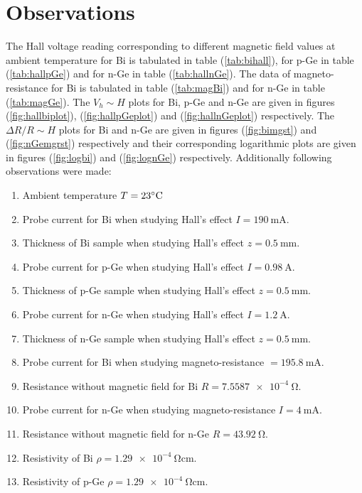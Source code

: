 \documentclass[%
 aip,
 amsmath,amssymb,
 reprint,%
]{revtex4-1}
\begin{document}
\section{Observations}
    The Hall voltage reading corresponding to different magnetic field values at ambient temperature for Bi is tabulated in table (\ref{tab:bihall}), for p-Ge in table (\ref{tab:hallpGe}) and for n-Ge in table (\ref{tab:hallnGe}). The data of magneto-resistance for Bi is tabulated in table (\ref{tab:magBi}) and for n-Ge in table (\ref{tab:magGe}). The $V_h \sim H$ plots for Bi, p-Ge and n-Ge are given in figures (\ref{fig:hallbiplot}), (\ref{fig:hallpGeplot}) and (\ref{fig:hallnGeplot}) respectively. The $\Delta R/R \sim H$ plots for Bi and n-Ge are given in figures (\ref{fig:bimgst}) and (\ref{fig:nGemgrst}) respectively and their corresponding logarithmic plots are given in figures (\ref{fig:logbi}) and (\ref{fig:lognGe}) respectively. Additionally following observations were made:
    \begin{enumerate}
        \item Ambient temperature $T =23 \celsius$
        \item Probe current for Bi when studying Hall's effect $I= \SI{190}{\milli \ampere}$.
        \item Thickness of Bi sample when studying Hall's effect $z =\SI{0.5}{\milli \metre}$.
        \item Probe current for p-Ge when studying Hall's effect $I= \SI{0.98}{ \ampere}$.
        \item Thickness of p-Ge sample when studying Hall's effect $z =\SI{0.5}{\milli \metre}$.
        \item Probe current for n-Ge when studying Hall's effect $I = \SI{1.2}{ \ampere}$.
        \item Thickness of n-Ge sample when studying Hall's effect $z =\SI{0.5}{\milli \metre}$.
        \item Probe current for Bi when studying magneto-resistance $= \SI{195.8}{\milli \ampere}$.
        \item Resistance without magnetic field for Bi $R = \SI{7.5587e-4}{\ohm}$.
        \item Probe current for n-Ge when studying magneto-resistance $I = \SI{4}{\milli \ampere}$.
        \item Resistance without magnetic field for n-Ge $R = \SI{43.92}{\ohm}$.
        \item Resistivity of Bi $\rho = \SI{1.29e-4}{\ohm \centi \metre}$.
        \item Resistivity of p-Ge $\rho = \SI{1.29e-4}{\ohm \centi \metre}$.
    \end{enumerate}
\end{document}
